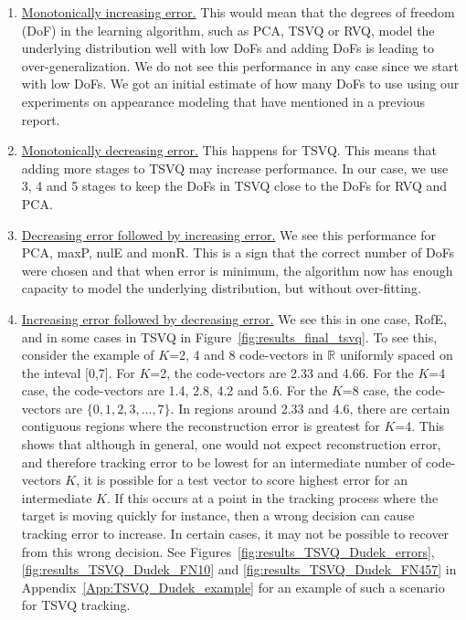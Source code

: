 \begin{Body}
\begin{enumerate}
\item \underline{Monotonically increasing error.}  This would mean that the degrees of freedom (DoF) in the learning algorithm, such as PCA, TSVQ or RVQ, model the underlying distribution well with low DoFs and adding DoFs is leading to over-generalization.  We do not see this performance in any case since we start with low DoFs.  We got an initial estimate of how many DoFs to use using our experiments on appearance modeling that have mentioned in a previous report.
\item \underline{Monotonically decreasing error.}  This happens for TSVQ.  This means that adding more stages to TSVQ may increase performance.  In our case, we use 3, 4 and 5 stages to keep the DoFs in TSVQ close to the DoFs for RVQ and PCA.
\item \underline{Decreasing error followed by increasing error.}  We see this performance for PCA, maxP, nulE and monR.  This is a sign that the correct number of DoFs were chosen and that when error is minimum, the algorithm now has enough capacity to model the underlying distribution, but without over-fitting.
\item \underline{Increasing error followed by decreasing error.}  We see this in one case, RofE, and in some cases in TSVQ in Figure~\ref{fig:results_final_tsvq}.  To see this, consider the example of $K$=2, 4 and 8 code-vectors in $\mathbb{R}$ uniformly spaced on the inteval [0,7].  For $K$=2, the code-vectors are 2.33 and 4.66.  For the $K$=4 case, the code-vectors are 1.4, 2.8, 4.2 and 5.6.  For the $K$=8 case, the code-vectors are $\{0, 1, 2, 3, \ldots, 7\}$.  In regions around 2.33 and 4.6, there are certain contiguous regions where the reconstruction error is greatest for $K$=4.  This shows that although in general, one would not expect reconstruction error, and therefore tracking error to be lowest for an intermediate number of code-vectors $K$, it is possible for a test vector to score highest error for an intermediate $K$.  If this occurs at a point in the tracking process where the target is moving quickly for instance, then a wrong decision can cause tracking error to increase.  In certain cases, it may not be possible to recover from this wrong decision.  See Figures~\ref{fig:results_TSVQ_Dudek_errors}, \ref{fig:results_TSVQ_Dudek_FN10} and \ref{fig:results_TSVQ_Dudek_FN457} in Appendix~\ref{App:TSVQ_Dudek_example} for an example of such a scenario for TSVQ tracking.


\end{enumerate}


\end{Body}
